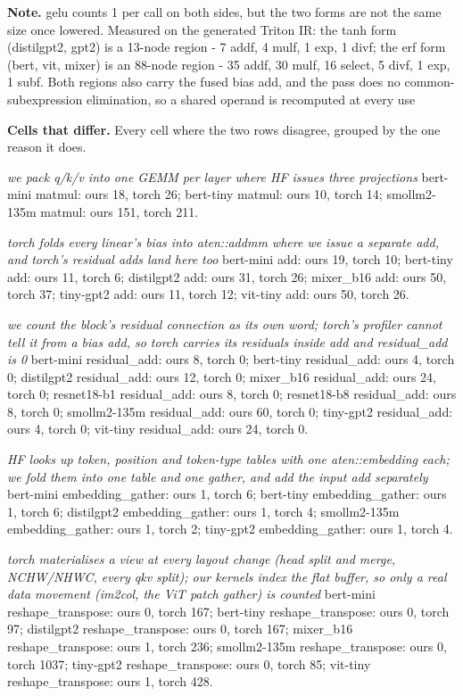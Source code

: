 \begin{minipage}{\linewidth}
\par\smallskip
\textbf{Note.} gelu counts 1 per call on both sides, but the two forms are not the same size once lowered. Measured on the generated Triton IR: the tanh form (distilgpt2, gpt2) is a 13-node region - 7 addf, 4 mulf, 1 exp, 1 divf; the erf form (bert, vit, mixer) is an 88-node region - 35 addf, 30 mulf, 16 select, 5 divf, 1 exp, 1 subf. Both regions also carry the fused bias add, and the pass does no common-subexpression elimination, so a shared operand is recomputed at every use
\par\smallskip
\textbf{Cells that differ.} Every cell where the two rows disagree, grouped by the one reason it does.
\par\smallskip
\emph{we pack q/k/v into one GEMM per layer where HF issues three projections} bert-mini matmul: ours 18, torch 26; bert-tiny matmul: ours 10, torch 14; smollm2-135m matmul: ours 151, torch 211.
\par\smallskip
\emph{torch folds every linear's bias into aten::addmm where we issue a separate add, and torch's residual adds land here too} bert-mini add: ours 19, torch 10; bert-tiny add: ours 11, torch 6; distilgpt2 add: ours 31, torch 26; mixer\_b16 add: ours 50, torch 37; tiny-gpt2 add: ours 11, torch 12; vit-tiny add: ours 50, torch 26.
\par\smallskip
\emph{we count the block's residual connection as its own word; torch's profiler cannot tell it from a bias add, so torch carries its residuals inside add and residual\_add is 0} bert-mini residual\_add: ours 8, torch 0; bert-tiny residual\_add: ours 4, torch 0; distilgpt2 residual\_add: ours 12, torch 0; mixer\_b16 residual\_add: ours 24, torch 0; resnet18-b1 residual\_add: ours 8, torch 0; resnet18-b8 residual\_add: ours 8, torch 0; smollm2-135m residual\_add: ours 60, torch 0; tiny-gpt2 residual\_add: ours 4, torch 0; vit-tiny residual\_add: ours 24, torch 0.
\par\smallskip
\emph{HF looks up token, position and token-type tables with one aten::embedding each; we fold them into one table and one gather, and add the input add separately} bert-mini embedding\_gather: ours 1, torch 6; bert-tiny embedding\_gather: ours 1, torch 6; distilgpt2 embedding\_gather: ours 1, torch 4; smollm2-135m embedding\_gather: ours 1, torch 2; tiny-gpt2 embedding\_gather: ours 1, torch 4.
\par\smallskip
\emph{torch materialises a view at every layout change (head split and merge, NCHW/NHWC, every qkv split); our kernels index the flat buffer, so only a real data movement (im2col, the ViT patch gather) is counted} bert-mini reshape\_transpose: ours 0, torch 167; bert-tiny reshape\_transpose: ours 0, torch 97; distilgpt2 reshape\_transpose: ours 0, torch 167; mixer\_b16 reshape\_transpose: ours 1, torch 236; smollm2-135m reshape\_transpose: ours 0, torch 1037; tiny-gpt2 reshape\_transpose: ours 0, torch 85; vit-tiny reshape\_transpose: ours 1, torch 428.

\end{minipage}
